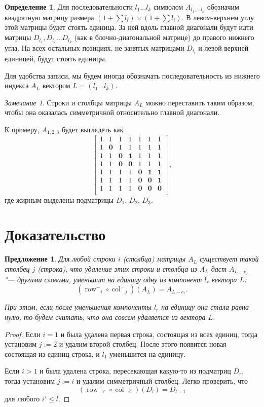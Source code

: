 \documentclass[oneside, a4paper]{article}
\newtheorem{proposition}{Предложение}
\theoremstyle{definition}
\newtheorem{definition}{Определение}
\theoremstyle{remark}
\newtheorem{remark}{Замечание}
\newcommand\rowm{\ensuremath{\operatorname{row}^-}}
\newcommand\colm{\ensuremath{\operatorname{col}^-}}
\begin{document}
\begin{definition}
Для последовательности $l_1 \dots l_k$ символом $A_{l_1, \dots l_k}$ обозначим
квадратную матрицу размера $(1 + \sum l_i) \times (1 + \sum l_i)$. В левом-верхнем
углу этой матрицы будет стоять единица. За ней вдоль главной диагонали будут идти
матрицы $D_{l_1}, D_{l_2} \dots D_{l_k}$ (как в блочно-диагональной матрице) до
правого нижнего угла. На всех остальных позициях, не занятых матрицами $D_{l_i}$
и левой верхней единицей, будут стоять единицы.
\end{definition}

Для удобства записи, мы будем иногда обозначать последовательность из нижнего
индекса $A_L$ вектором $L = (l_1 \dots l_k)$.

\begin{remark}
Строки и столбцы матрицы $A_L$ можно переставить таким образом, чтобы она
оказалась симметричной относительно главной диагонали.
\end{remark}

К примеру, $A_{1, 2, 3}$ будет выглядеть как
\[
\begin{bmatrix}
1 & 1 & 1 & 1 & 1 & 1 & 1 \\
1 & \mathbf{0} & 1 & 1 & 1 & 1 & 1 \\
1 & 1 & \mathbf{0} & \mathbf{1} & 1 & 1 & 1 \\
1 & 1 & \mathbf{0} & \mathbf{0} & 1 & 1 & 1 \\
1 & 1 & 1 & 1 & \mathbf{0} & \mathbf{1} & \mathbf{1} \\
1 & 1 & 1 & 1 & \mathbf{0} & \mathbf{0} & \mathbf{1} \\
1 & 1 & 1 & 1 & \mathbf{0} & \mathbf{0} & \mathbf{0} \\
\end{bmatrix},
\]
где жирным выделены подматрицы $D_1$, $D_2$, $D_3$.

\section{Доказательство}

\begin{proposition} \label{easy}
Для любой строки $i$ (столбца) матрицы $A_L$ существует такой столбец $j$
(строка), что удаление этих строки и столбца из $A_L$ даст $A_{L - e_r}$ "---
другими словами, уменьшит на единицу одну из компонент $l_r$ вектора $L$:
\[
(\rowm_i \circ \colm_j)(A_L) = A_{L - e_r}.
\]

При этом, если после уменьшения компоненты $l_r$ на единицу она стала равна нулю,
то будем считать, что она совсем удаляется из вектора $L$.
\end{proposition}
\begin{proof}
Если $i = 1$ и была удалена первая строка, состоящая из всех единиц, тогда
установим $j := 2$ и удалим второй столбец. После этого появится новая состоящая
из единиц строка, и $l_1$ уменьшится на единицу.

Если $i > 1$ и была удалена строка, пересекающая какую-то из подматриц $D_r$,
тогда установим $j := i$ и удалим симметричный столбец. Легко проверить, что
\[
(\rowm_{i'} \circ \colm_{i'})(D_l) = D_{l-1}
\]
для любого $i' \leq l$.
\end{proof}
\end{document}
